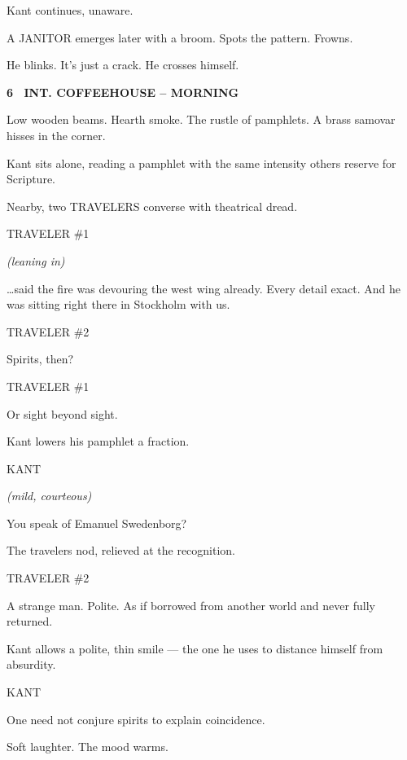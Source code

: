 \documentclass[12pt]{article}
\newcommand{\scene}[2]{%
  \vspace{1.8\baselineskip}%
  \noindent\textbf{#1 \ #2}\par\vspace{0.4\baselineskip}%
}
\newenvironment{dialogue}[1]{%
  \vspace{0.8\baselineskip}%
  \noindent\hspace*{2.3in}\textsc{#1}\par%
  \noindent\hspace*{1.5in}\begin{minipage}[t]{4.5in}%
}{%
  \end{minipage}\par%
}
\newcommand{\paren}[1]{%
  \noindent\hspace*{1.8in}\textit{(#1)}\par%
}
\begin{document}
Kant continues, unaware.

A JANITOR emerges later with a broom. Spots the pattern. Frowns.

He blinks. It's just a crack. He crosses himself.


\scene{6}{INT. COFFEEHOUSE -- MORNING}

Low wooden beams. Hearth smoke. The rustle of pamphlets. A brass
samovar hisses in the corner.

Kant sits alone, reading a pamphlet with the same intensity others
reserve for Scripture.

Nearby, two TRAVELERS converse with theatrical dread.

\begin{dialogue}{TRAVELER \#1}
\paren{leaning in}
\ldots said the fire was devouring the west wing already. Every detail
exact. And he was sitting right there in Stockholm with us.
\end{dialogue}

\begin{dialogue}{TRAVELER \#2}
Spirits, then?
\end{dialogue}

\begin{dialogue}{TRAVELER \#1}
Or sight beyond sight.
\end{dialogue}

Kant lowers his pamphlet a fraction.

\begin{dialogue}{KANT}
\paren{mild, courteous}
You speak of Emanuel Swedenborg?
\end{dialogue}

The travelers nod, relieved at the recognition.

\begin{dialogue}{TRAVELER \#2}
A strange man. Polite. As if borrowed from another world and never fully
returned.
\end{dialogue}

Kant allows a polite, thin smile --- the one he uses to distance himself
from absurdity.

\begin{dialogue}{KANT}
One need not conjure spirits to explain coincidence.
\end{dialogue}

Soft laughter. The mood warms.
\end{document}

